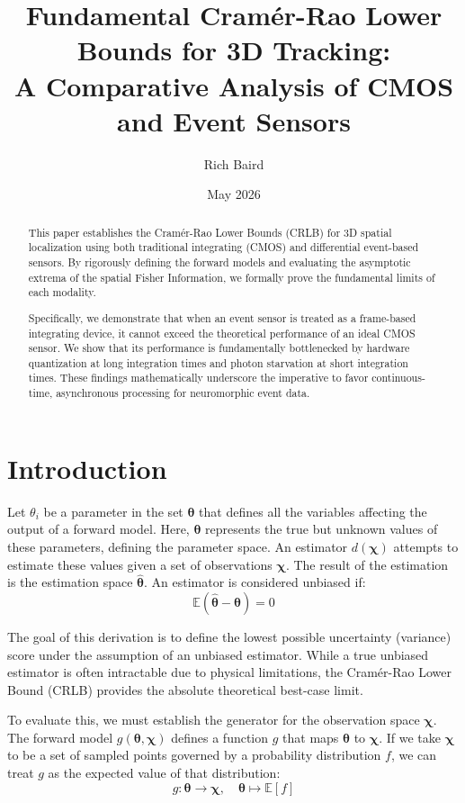 \documentclass[11pt]{article}
\title{\textbf{Fundamental Cramér-Rao Lower Bounds for 3D Tracking:\\ A Comparative Analysis of CMOS and Event Sensors}}
\author{Rich Baird}
\date{May 2026}
\begin{document}
\maketitle

\begin{abstract}
This paper establishes the Cramér-Rao Lower Bounds (CRLB) for 3D spatial localization using both traditional integrating (CMOS) and differential event-based sensors. By rigorously defining the forward models and evaluating the asymptotic extrema of the spatial Fisher Information, we formally prove the fundamental limits of each modality. 

Specifically, we demonstrate that when an event sensor is treated as a frame-based integrating device, it cannot exceed the theoretical performance of an ideal CMOS sensor. We show that its performance is fundamentally bottlenecked by hardware quantization
at long integration times and photon starvation at short integration times. These findings mathematically underscore the imperative to favor continuous-time, asynchronous processing for neuromorphic event data.
\end{abstract}

\section{Introduction}

Let $\theta_i$ be a parameter in the set $\bm{\theta}$ that defines all the variables affecting the output of a forward model. Here, $\bm{\theta}$ represents the true but unknown values of these parameters, defining the parameter space. An estimator $d(\bm{\chi})$ attempts to estimate these values given a set of observations $\bm{\chi}$. The result of the estimation is the estimation space $\hat{\bm{\theta}}$. An estimator is considered unbiased if:
\begin{equation}
\mathbb{E} (\hat{\bm{\theta}} - \bm{\theta}) = 0
\end{equation}

The goal of this derivation is to define the lowest possible uncertainty (variance) score under the assumption of an unbiased estimator. While a true unbiased estimator is often intractable due to physical limitations, the Cramér-Rao Lower Bound (CRLB) provides the absolute theoretical best-case limit.

To evaluate this, we must establish the generator for the observation space $\bm{\chi}$. The forward model $g(\bm{\theta}, \bm{\chi})$ defines a function $g$ that maps $\bm{\theta}$ to $\bm{\chi}$. If we take $\bm{\chi}$ to be a set of sampled points governed by a probability distribution $f$, we can treat $g$ as the expected value of that distribution:
\begin{equation}
g: \bm{\theta} \to \bm{\chi}, \quad \bm{\theta} \mapsto \mathbb{E} \left[f\right]
\end{equation}
\end{document}
